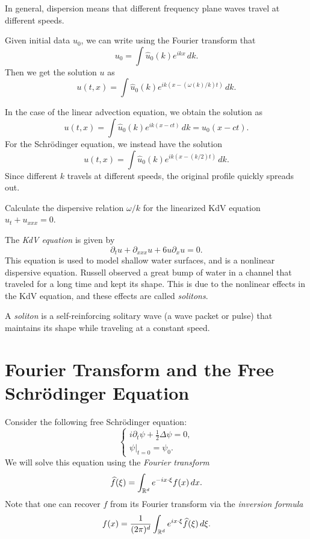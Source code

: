 \begin{remark}
  In general, dispersion means that different
  frequency plane waves travel at different speeds.
\end{remark}

\begin{remark}
  Given initial data $u_0$,
  we can write using the Fourier transform that
  \[
    u_0 = \int \widehat{u}_0(k) e^{ikx} \, dk.
  \]
  Then we get the solution $u$ as
  \[
    u(t, x) = \int \widehat{u}_0(k) e^{i k (x - (\omega(k) / k) t)} \, dk.
  \]
\end{remark}

\begin{example}
  In the case of the linear advection equation, we
  obtain the solution as
  \[
    u(t, x) = \int \widehat{u}_0(k) e^{i k (x - ct)} \, dk
    = u_0(x - ct).
  \]
  For the Schr\"odinger equation, we instead have
  the solution
  \[
    u(t, x) = \int \widehat{u}_0(k) e^{i k (x - (k / 2) t)} \, dk.
  \]
  Since different $k$ travels at different speeds,
  the original profile quickly spreads out.
\end{example}

\begin{exercise}
  Calculate the dispersive relation $\omega / k$
  for the linearized KdV equation $u_t + u_{xxx} = 0$.
\end{exercise}

\begin{example}
  The \emph{KdV equation} is given by
  \[
    \partial_t u + \partial_{xxx} u + 6 u \partial_x u = 0.
  \]
  This equation is used to model shallow water
  surfaces, and is a nonlinear dispersive
  equation. Russell observed a great bump of water
  in a channel that traveled for a long time
  and kept its shape. This is due to the
  nonlinear effects in the KdV equation, and these
  effects are called \emph{solitons}.
\end{example}

\begin{definition}
  A \emph{soliton} is a self-reinforcing solitary
  wave (a wave packet or pulse) that maintains
  its shape while traveling at a constant speed.
\end{definition}

\section{Fourier Transform and the Free Schr\"odinger Equation}
Consider the following free Schr\"odinger equation:
\[
  \begin{cases}
    i \partial_t \psi + \frac{1}{2} \Delta \psi = 0, \\
    \psi|_{t = 0} = \psi_0.
  \end{cases}
\]
We will solve this equation using the \emph{Fourier transform}
\[
  \widehat{f}(\xi) = \int_{\mathbb{R}^d} e^{-ix \cdot \xi} f(x)\, dx.
\]
Note that one can recover $f$ from its Fourier
transform via the \emph{inversion formula}
\[
  f(x) = \frac{1}{(2\pi)^d} \int_{\mathbb{R}^d} e^{ix \cdot \xi} \widehat{f}(\xi)\, d\xi.
\]

